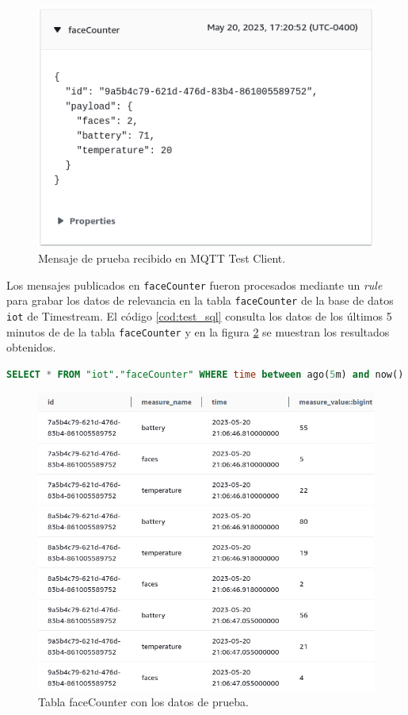\begin{figure}[h]
	\centering
	\includegraphics[scale=0.45]{./Figures/test_iot.png}
	\caption{Mensaje de prueba recibido en MQTT Test Client.}
	\label{fig:test_iot}
\end{figure}

Los mensajes publicados en \texttt{faceCounter} fueron procesados mediante un \textit{rule} para grabar los datos de relevancia en la tabla \texttt{faceCounter} de la base de datos \texttt{iot} de Timestream. El código \ref{cod:test_sql} consulta los datos de los últimos 5 minutos de  de la tabla \texttt{faceCounter} y en la figura \ref{fig:test_timestream} se muestran los resultados obtenidos.

\begin{lstlisting}[language=SQL, label=cod:test_sql, caption=Código SQL para obtener los datos de la tabla faceCounter.]
SELECT * FROM "iot"."faceCounter" WHERE time between ago(5m) and now() ORDER BY time 
\end{lstlisting}

\begin{figure}[h]
	\centering
	\includegraphics[scale=0.45]{./Figures/test_timestream.png}
	\caption{Tabla faceCounter con los datos de prueba.}
	\label{fig:test_timestream}
\end{figure}


